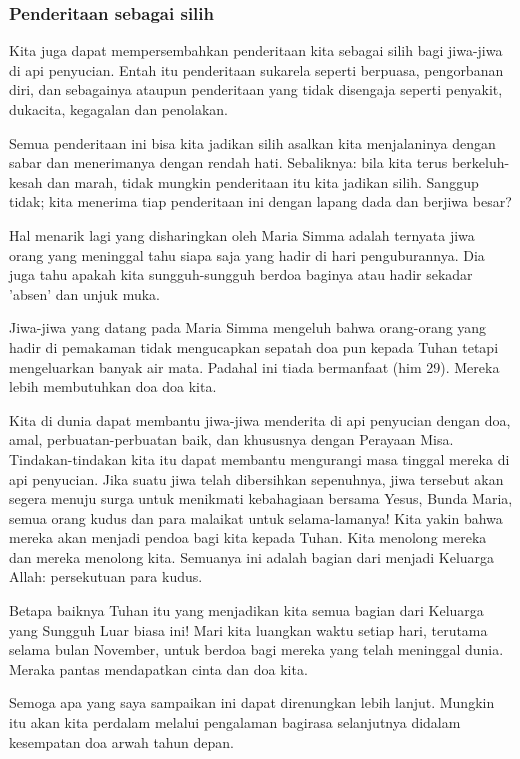 \documentclass[a5paper,headsepline,titlepage,10pt,nnormalheadings,DIVcalc]{scrbook}
\begin{document}
\subsubsection*{Penderitaan sebagai silih}

Kita juga dapat mempersembahkan penderitaan kita sebagai silih bagi jiwa-jiwa di api penyucian.
Entah itu penderitaan sukarela seperti berpuasa, pengorbanan diri, dan sebagainya ataupun penderitaan yang tidak disengaja seperti penyakit, dukacita, kegagalan dan penolakan.

Semua penderitaan ini bisa kita jadikan silih asalkan kita menjalaninya dengan sabar dan menerimanya dengan rendah hati. Sebaliknya: bila kita terus berkeluh-kesah dan marah, tidak mungkin penderitaan itu kita jadikan silih. Sanggup tidak; kita menerima tiap penderitaan ini dengan lapang dada dan berjiwa besar?

Hal menarik lagi yang disharingkan oleh Maria Simma adalah ternyata jiwa orang yang meninggal tahu siapa saja yang hadir di hari penguburannya. Dia juga tahu apakah kita sungguh-sungguh berdoa baginya atau hadir sekadar 'absen' dan unjuk muka.

Jiwa-jiwa yang datang pada Maria Simma mengeluh bahwa orang-orang yang hadir di pemakaman tidak mengucapkan sepatah doa pun kepada Tuhan tetapi mengeluarkan banyak air mata. Padahal ini tiada bermanfaat (him 29). Mereka lebih membutuhkan doa doa kita. 

Kita di dunia dapat membantu jiwa-jiwa menderita di api penyucian dengan doa, amal, perbuatan-perbuatan baik, dan khususnya dengan Perayaan Misa. Tindakan-tindakan kita itu dapat membantu mengurangi masa tinggal mereka di api penyucian. Jika suatu jiwa telah dibersihkan sepenuhnya, jiwa tersebut akan segera menuju surga untuk menikmati kebahagiaan bersama Yesus, Bunda Maria, semua orang kudus dan para malaikat untuk selama-lamanya! Kita yakin bahwa mereka akan menjadi pendoa bagi kita kepada Tuhan. Kita menolong mereka dan mereka menolong kita. Semuanya ini adalah bagian dari menjadi Keluarga Allah: persekutuan para kudus.

Betapa baiknya Tuhan itu yang menjadikan kita semua bagian dari Keluarga yang Sungguh Luar biasa ini! Mari kita luangkan waktu setiap hari, terutama selama bulan November, untuk berdoa bagi mereka yang telah meninggal dunia. Meraka pantas mendapatkan cinta dan doa kita.

Semoga apa yang saya sampaikan ini dapat direnungkan lebih lanjut. Mungkin itu akan kita perdalam melalui pengalaman bagirasa selanjutnya didalam kesempatan doa arwah tahun depan.
\end{document}
